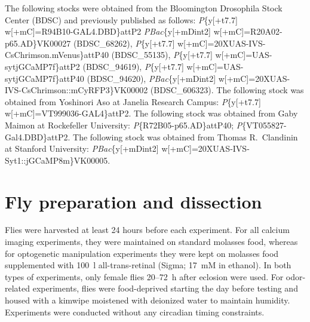 {\raggedright
The following stocks were obtained from the Bloomington Drosophila Stock Center (BDSC) and previously published as follows: \textit{P}\{y[+t7.7] w[+mC]=R94B10-GAL4.DBD\}attP2 \textit{PBac}\{y[+mDint2] w[+mC]=R20A02-p65.AD\}VK00027 (BDSC\_68262), \textit{P}\{y[+t7.7] w[+mC]=20XUAS-IVS-CsChrimson.mVenus\}attP40 (BDSC\_55135), \textit{P}\{y[+t7.7] w[+mC]=UAS-sytjGCaMP7f\}attP2 (BDSC\_94619), \textit{P}\{y[+t7.7] w[+mC]=UAS-sytjGCaMP7f\}attP40 (BDSC\_94620), \textit{PBac}\{y[+mDint2] w[+mC]=20XUAS-IVS-CsChrimson::mCyRFP3\}VK00002 (BDSC\_606323).
The following stock was obtained from Yoshinori Aso at Janelia Research Campus: \textit{P}\{y[+t7.7] w[+mC]=VT999036-GAL4\}attP2.
The following stock was obtained from Gaby Maimon at Rockefeller University: \textit{P}\{R72B05-p65.AD\}attP40; \textit{P}\{VT055827-Gal4.DBD\}attP2.
The following stock was obtained from Thomas R.\ Clandinin at Stanford University: \textit{PBac}\{y[+mDint2] w[+mC]=20XUAS-IVS-Syt1::jGCaMP8m\}VK00005.

}

\section{Fly preparation and dissection}

Flies were harvested at least 24 hours before each experiment. For all calcium imaging experiments, they were maintained on standard molasses food, whereas for optogenetic manipulation experiments they were kept on molasses food supplemented with 100~\textmu l all-trans-retinal (Sigma; 17~mM in ethanol). In both types of experiments, only female flies 20--72~h after eclosion were used. For odor-related experiments, flies were food-deprived starting the day before testing and housed with a kimwipe moistened with deionized water to maintain humidity. Experiments were conducted without any circadian timing constraints.

